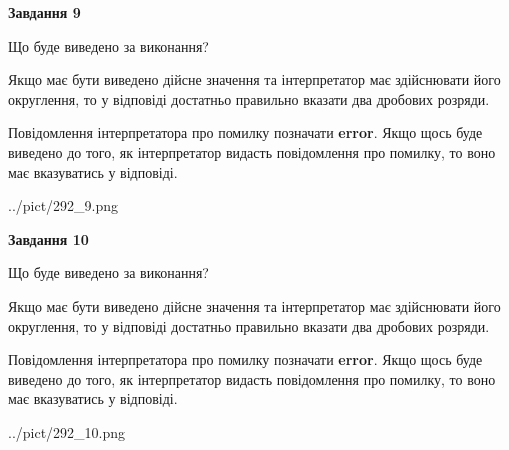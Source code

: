 \documentclass[12pt, ukrainian]{article}
\begin{document}
{\begin {Large}
{\begin {center}\textbf{Завдання 9}\end {center}}\par
Що буде виведено за виконання? \par

Якщо має бути виведено дійсне значення та інтерпретатор має здійснювати його округлення, 
то у відповіді достатньо правильно вказати два дробових розряди.

Повідомлення інтерпретатора про помилку позначати \textbf{error}.
Якщо щось буде виведено до того, як інтерпретатор видасть повідомлення про помилку, 
то воно має вказуватись у відповіді. \par

\begin{center}
	{../pict/292_9.png}
\end{center}
\newpage

{\begin {center}\textbf{Завдання 10}\end {center}}\par
Що буде виведено за виконання? \par

Якщо має бути виведено дійсне значення та інтерпретатор має здійснювати його округлення, 
то у відповіді достатньо правильно вказати два дробових розряди.

Повідомлення інтерпретатора про помилку позначати \textbf{error}.
Якщо щось буде виведено до того, як інтерпретатор видасть повідомлення про помилку, 
то воно має вказуватись у відповіді. \par

\begin{center}
	{../pict/292_10.png}
\end{center}
\newpage

\end {Large}}
\end{document}
